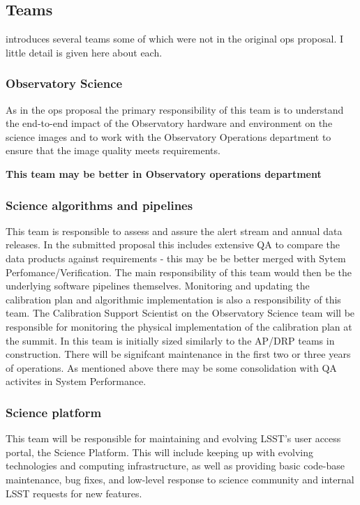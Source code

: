 \newpage
\subsection{Teams }\label{sec:teams}
 introduces several teams some of which were not in the original ops proposal. I  little detail is given here about each.

\subsubsection{Observatory Science}
As in the ops proposal the primary responsibility of this team is to understand the end-to-end impact of the Observatory hardware and environment on the science images and to work with the Observatory Operations department to ensure that the image quality meets requirements.

\textbf{This team may be better  in Observatory operations department }

\subsubsection{Science algorithms and pipelines}
This team is responsible to assess and assure the alert stream and annual data releases.
In the submitted proposal this includes extensive \gls{QA} to compare the data products against requirements -
this may be be better merged with Sytem Perfomance/Verification.
The main responsibility  of this team  would then be the  underlying \gls{software} pipelines themselves. Monitoring and updating the calibration plan and algorithmic implementation is also a responsibility of this team. The Calibration Support Scientist on the Observatory Science team will be responsible for monitoring the physical implementation of the calibration plan at the summit.
In  this team is initially sized similarly to the AP/DRP teams in construction. There will be signifcant maintenance in the first two or three years of operations. As mentioned above there may be some consolidation with \gls{QA} activites in System Performance.

\subsubsection{Science platform  }
This team will be responsible for maintaining and evolving LSST’s user access portal, the Science Platform. This will include keeping up with evolving technologies and computing infrastructure, as well as providing basic code-base maintenance, bug fixes, and low-level response to science community and internal \gls{LSST} requests for new features.


